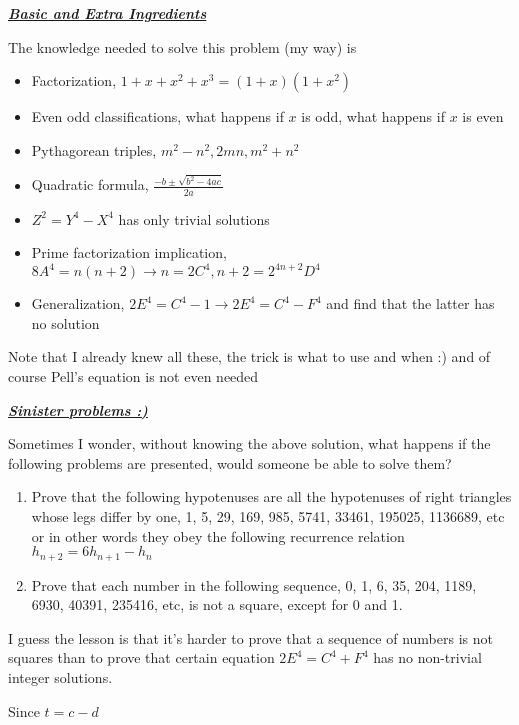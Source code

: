 \documentclass[aps,preprint,preprintnumbers,nofootinbib,showpacs,prd]{revtex4-1}
\newcommand{\bit}{\begin{itemize}}
\newcommand{\eit}{\end{itemize}}
\begin{document}
\bigskip
\underline{\textbf{\textit{Basic and Extra Ingredients}}}

The knowledge needed to solve this problem (my way) is
\bit
\item Factorization, $1 + x + x^2 + x^3 = (1 + x)(1 + x^2)$
%
\item Even odd classifications, what happens if $x$ is odd, what happens if $x$ is even
%
\item Pythagorean triples, $m^2 - n^2, 2mn, m^2 + n^2$
%
\item Quadratic formula, $\frac{-b \pm \sqrt{b^2 - 4ac}}{2a}$
%
\item $Z^2 = Y^4 - X^4$ has only trivial solutions
%
\item Prime factorization implication, $8A^4 = n(n+2) \to n = 2C^4, n + 2 = 2^{4n+2}D^4$
%
\item Generalization, $2E^4 = C^4 - 1 \to 2E^4 = C^4 - F^4$ and find that the latter has no solution
\eit
%
Note that I already knew all these, the trick is what to use and when :) and of course Pell's equation is not even needed


\bigskip
\underline{\textbf{\textit{Sinister problems :)}}}

Sometimes I wonder, without knowing the above solution, what happens if the following problems are presented, would someone be able to solve them?
\begin{enumerate}
\item Prove that the following hypotenuses are all the hypotenuses of right triangles whose legs differ by one, 1, 5, 29, 169, 985, 5741, 33461, 195025, 1136689, etc or in other words they obey the following recurrence relation $h_{n+2} = 6h_{n+1} - h_n$
%
\item Prove that each number in the following sequence, 0, 1, 6, 35, 204, 1189, 6930, 40391, 235416, etc, is not a square, except for 0 and 1.
\end{enumerate}

I guess the lesson is that it's harder to prove that a sequence of numbers is not squares than to prove that certain equation $2E^4 = C^4 + F^4$ has no non-trivial integer solutions.

















Since $t = c - d$
\end{document}
